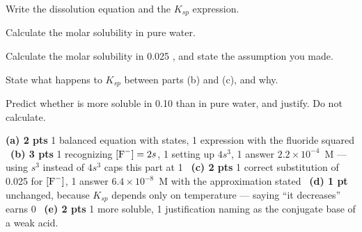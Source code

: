 \documentclass{apchem-worksheet}
\begin{document}
\begin{parts}
  \item Write the dissolution equation and the $K_{sp}$ expression.
  \item Calculate the molar solubility in pure water. \workspace[2.6cm]
  \item Calculate the molar solubility in \SI{0.025}{\Molar} , and
        state the assumption you made. \workspace[3cm]
  \item State what happens to $K_{sp}$ between parts (b) and (c), and why.
  \item Predict whether  is more soluble in
        \SI{0.10}{\Molar}  than in pure water, and justify.
        Do not calculate. 
\end{parts}

\begin{apcnote}
\textbf{(a) 2 pts} 1 balanced equation with states, 1 expression with the
fluoride squared \textbullet\ \textbf{(b) 3 pts} 1 recognizing
$[\ce{F-}] = 2s$, 1 setting up $4s^3$, 1 answer $2.2\times10^{-4}$~M ---
using $s^3$ instead of $4s^3$ caps this part at 1 \textbullet\
\textbf{(c) 2 pts} 1 correct substitution of 0.025 for $[\ce{F-}]$,
1 answer $6.4\times10^{-8}$~M with the approximation stated \textbullet\
\textbf{(d) 1 pt} unchanged, because $K_{sp}$ depends only on temperature
--- saying ``it decreases'' earns 0 \textbullet\ \textbf{(e) 2 pts}
1 more soluble, 1 justification naming \ce{F-} as the conjugate base of a
weak acid.
\end{apcnote}
\end{document}

